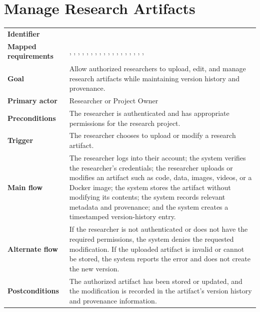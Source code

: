\section{Manage Research Artifacts}
\begin{tabularx}{\linewidth}{L{3.5cm}Y}
\toprule
\textbf{Identifier} & \\
\textbf{Mapped requirements} & , , , , , , , , , , , , , , , , , , \\
\textbf{Goal} & Allow authorized researchers to upload, edit, and manage research artifacts while maintaining version history and provenance.\\
\textbf{Primary actor} & Researcher or Project Owner\\
\textbf{Preconditions} & The researcher is authenticated and has appropriate permissions for the research project.\\
\textbf{Trigger} & The researcher chooses to upload or modify a research artifact.\\
\textbf{Main flow} & The researcher logs into their account; the system verifies the researcher's credentials; the researcher uploads or modifies an artifact such as code, data, images, videos, or a Docker image; the system stores the artifact without modifying its contents; the system records relevant metadata and provenance; and the system creates a timestamped version-history entry.\\
\textbf{Alternate flow} & If the researcher is not authenticated or does not have the required permissions, the system denies the requested modification. If the uploaded artifact is invalid or cannot be stored, the system reports the error and does not create the new version.\\
\textbf{Postconditions} & The authorized artifact has been stored or updated, and the modification is recorded in the artifact's version history and provenance information.\\
\bottomrule
\end{tabularx}


